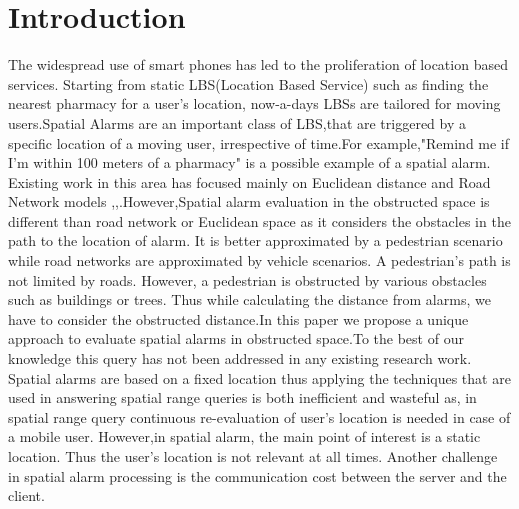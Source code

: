 \documentclass{sig-alternate}
\begin{document}
\section{Introduction}
The widespread use of smart phones has led to the proliferation of location based services. %
Starting from static LBS(Location Based Service) such as finding the nearest pharmacy for a user's location, now-a-days LBSs are tailored for moving users.Spatial Alarms are an important class of LBS,that are triggered by a specific location of a moving user, irrespective of time.For example,"Remind me if I'm within 100 meters of a pharmacy" is a possible example of a spatial alarm.\\
Existing work in this area has focused mainly on Euclidean distance and Road Network models \cite{bamba},\cite{roadalarm},\cite{liu}.However,Spatial alarm evaluation in the obstructed space is different than road network or Euclidean space as it considers the obstacles in the path to the location of alarm. It is better approximated by a pedestrian scenario while road networks are approximated by vehicle scenarios. A pedestrian's path is not limited by roads. However, a pedestrian is obstructed by various obstacles such as buildings or trees. Thus while calculating the distance from alarms, we have to consider the obstructed distance.\cite{ognn}In this paper we propose a unique approach to evaluate spatial alarms in obstructed space.To the best of our knowledge this query has not been addressed in any existing research work.\\
Spatial alarms are based on a fixed location thus applying the techniques that are used in answering spatial range queries is both inefficient and wasteful as, in spatial range query continuous re-evaluation of user's location is needed in case of a mobile user. However,in spatial alarm, the main point of interest is a static location. Thus the user's location is not relevant at all times.
Another  challenge in spatial alarm processing is the communication cost between the server and the client. 
\end{document}
